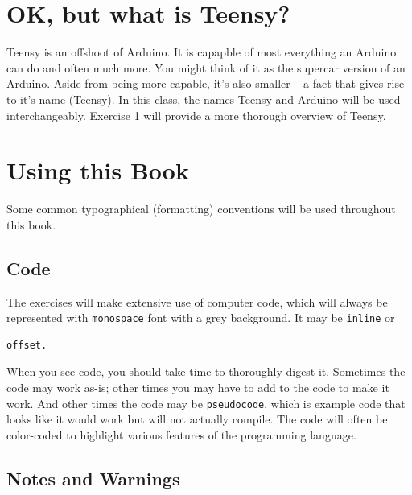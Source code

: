 \documentclass[]{book}
\begin{document}
\hypertarget{ok-but-what-is-teensy}{%
\section*{OK, but what is Teensy?}\label{ok-but-what-is-teensy}}

Teensy is an offshoot of Arduino. It is capapble of most everything an Arduino can do and often much more. You might think of it as the supercar version of an Arduino. Aside from being more capable, it's also smaller -- a fact that gives rise to it's name (Teensy). In this class, the names Teensy and Arduino will be used interchangeably. Exercise 1 will provide a more thorough overview of Teensy.

\hypertarget{using-this-book}{%
\section*{Using this Book}\label{using-this-book}}

Some common typographical (formatting) conventions will be used throughout this book.

\hypertarget{code}{%
\subsection*{Code}\label{code}}

The exercises will make extensive use of computer code, which will always be represented with \texttt{monospace} font with a grey background. It may be \texttt{inline} or

\begin{verbatim}
offset.
\end{verbatim}

When you see code, you should take time to thoroughly digest it. Sometimes the code may work as-is; other times you may have to add to the code to make it work. And other times the code may be \texttt{pseudocode}, which is example code that looks like it would work but will not actually compile. The code will often be color-coded to highlight various features of the programming language.

\hypertarget{notes-and-warnings}{%
\subsection*{Notes and Warnings}\label{notes-and-warnings}}
\end{document}
